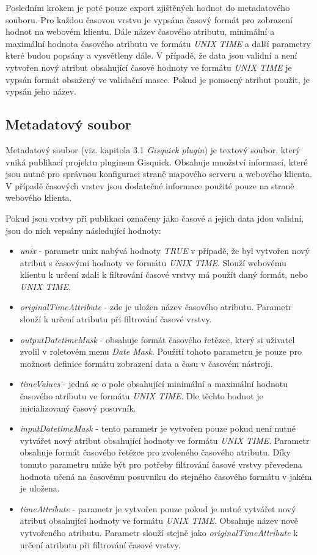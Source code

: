 Posledním krokem je poté pouze export zjištěných hodnot do metadatového souboru. Pro každou časovou vrstvu je vypsána časový formát pro zobrazení hodnot na webovém klientu. Dále název časového atributu, minimální a maximální hodnota časového atributu ve formátu \textit{UNIX TIME} a další parametry které budou popsány a vysvětleny dále. V případě, že data jsou validní a není vytvořen nový atribut obsahující časové hodnoty ve formátu \textit{UNIX TIME} je vypsán formát obsažený ve validační masce. Pokud je pomocný atribut použit, je vypsán jeho název.


\subsection{Metadatový soubor}

Metadatový soubor (viz. kapitola 3.1 \textit{Gisquick plugin}) je textový soubor, který vniká publikací projektu pluginem Gisquick. Obsahuje množství informací, které jsou nutné pro správnou konfiguraci straně mapového serveru a webového klienta. V případě časových vrstev jsou dodatečné informace použité pouze na straně webového klienta. 

Pokud jsou vrstvy při publikaci označeny jako časové a jejich data jdou validní, jsou do nich vepsány následující hodnoty:

\begin{itemize}
	\item\textit{unix} - parametr unix nabývá hodnoty \textit{TRUE} v případě, že byl vytvořen nový atribut s časovými hodnoty ve formátu \textit{UNIX TIME}. Slouží webovému klientu k určení zdali k filtrování časové vrstvy má použít daný formát, nebo \textit{UNIX TIME}.
	\item\textit{originalTimeAttribute} - zde je uložen název časového atributu. Parametr slouží k určení atributu při filtrování časové vrstvy. 
	\item\textit{outputDatetimeMask} - obsahuje formát časového řetězce, který si uživatel zvolil v roletovém menu \textit{Date Mask}. Použití tohoto parametru je pouze pro možnost definice formátu zobrazení data a času v časovém nástroji.
	\item\textit{timeValues} - jedná se o pole obsahující minimální a maximální hodnotu časového atributu ve formátu \textit{UNIX TIME}. Dle těchto hodnot je inicializovaný časový posuvník. 
	\item\textit{inputDatetimeMask} - tento parametr je vytvořen pouze pokud není nutné vytvářet nový atribut obsahující hodnoty ve formátu \textit{UNIX TIME}. Parametr obsahuje formát časového řetězce pro zvoleného časového atributu. Díky tomuto parametru může být pro potřeby filtrování časové vrstvy převedena hodnota učená na časovému posuvníku do stejného časového formátu v jakém je uložena. 
	\item\textit{timeAttribute} - parametr je vytvořen pouze pokud je nutné vytvářet nový atribut obsahující hodnoty ve formátu \textit{UNIX TIME}. Obsahuje název nově vytvořeného atributu. Parametr slouží stejně jako \textit{originalTimeAttribute} k určení atributu při filtrování časové vrstvy.  
\end{itemize}

